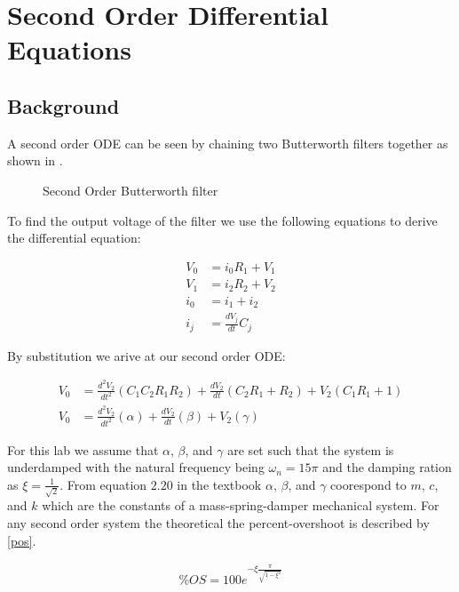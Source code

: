 \documentclass[main.tex]{subfile}
\begin{document}
\section{Second Order Differential Equations}
\label{sec:seAnalaysis}

\subsection{Background}
\label{sec:background}

A second order ODE can be seen by chaining two Butterworth filters together as
shown in .

\begin{figure}[H]
	\begin{center}
	\end{center}
	\caption{Second Order Butterworth filter}
	\label{fig:seCircuit}
\end{figure}

To find the output voltage of the filter we use the following equations to
derive the differential equation:

\begin{align*}
	V_0 &= i_0R_1 + V_1
	\\V_1 &= i_2R_2 + V_2
	\\i_0 &= i_1 + i_2
	\\i_j &= \frac{dV_j}{dt}C_j
\end{align*}

By substitution we arive at our second order ODE:

\begin{align}
	V_0 &= \frac{d^2V_2}{dt^2}(C_1C_2R_1R_2) + \frac{dV_2}{dt}(C_2R_1 + R_2) + V_2(C_1R_1 + 1)
	\\V_0 &= \frac{d^2V_2}{dt^2}(\alpha) + \frac{dV_2}{dt}(\beta) + V_2(\gamma)
\end{align}

For this lab we assume that $\alpha$, $\beta$, and $\gamma$ are set such that
the system is underdamped with the natural frequency being $\omega_n = 15\pi$
and the damping ration as $\xi = \frac{1}{\sqrt{2}}$. From equation $2.20$ in
the textbook $\alpha$, $\beta$, and $\gamma$ coorespond to $m$, $c$, and $k$
which are the constants of a mass-spring-damper mechanical system. For any
second order system the theoretical the percent-overshoot is described by
\eqref{pos}.

\begin{align}
	\%OS = 100 e^{-\xi \frac{\pi}{\sqrt{1-\xi^2}}} \label{eq:pos}
\end{align}
\end{document}
